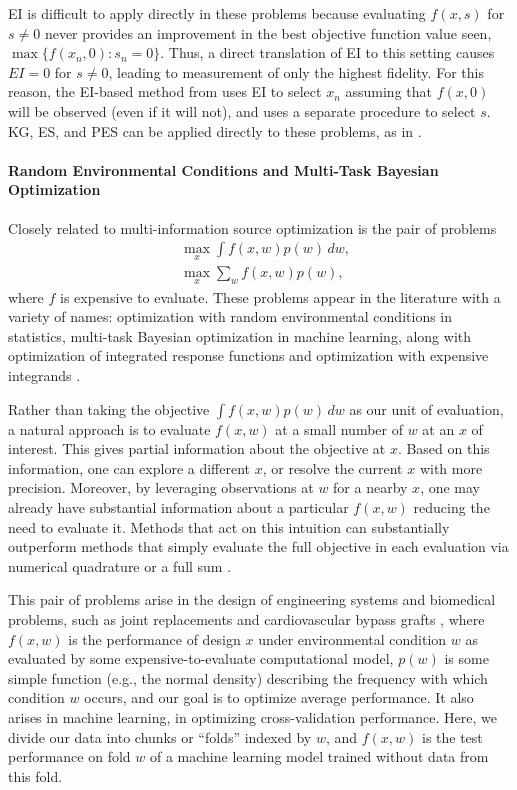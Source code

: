 \documentclass{article}
\begin{document}
EI is difficult to apply directly in these problems because evaluating $f(x,s)$ for $s\ne 0$ never provides an improvement in the best objective function value seen, $\max \{ f(x_n,0) : s_n = 0 \}$.  Thus, a direct translation of EI to this setting causes $EI=0$ for $s\ne 0$, leading to measurement of only the highest fidelity.  For this reason, the EI-based method from \cite{lam2015multifidelity}
uses EI to select $x_n$ assuming that $f(x,0)$ will be observed (even if it will not), and uses a separate procedure to select $s$.  KG, ES, and PES can be applied directly to these problems, as in \cite{poloczek2017multi}. 

\paragraph{Random Environmental Conditions and Multi-Task Bayesian Optimization}
Closely related to multi-information source optimization is the pair of problems
\begin{align*}
&\max_x \int f(x,w) p(w)\,dw,\\
&\max_x \sum_w f(x,w) p(w),
\end{align*}
where $f$ is expensive to evaluate.  
These problems appear in the literature with a variety of names: optimization with random environmental conditions \citep{chang2001design} in statistics, multi-task Bayesian optimization \citep{swersky2013multi} in machine learning, along with optimization of integrated response functions \citep{williams2000sequential} and optimization with expensive integrands \citep{toscano2018bayesian}.

Rather than taking the objective $\int f(x,w) p(w)\,dw$ as our unit of evaluation, a natural approach is to evaluate $f(x,w)$ at a small number of $w$ at an $x$ of interest.  This gives partial information about the objective at $x$.  Based on this information, one can explore a different $x$, or resolve the current $x$ with more precision.  Moreover, by leveraging observations at $w$ for a nearby $x$, one may already have substantial information about a particular $f(x,w)$ reducing the need to evaluate it.  Methods that act on this intuition can substantially outperform methods that simply evaluate the full objective in each evaluation via numerical quadrature or a full sum \citep{toscano2018bayesian}.

This pair of problems arise in the design of engineering systems and biomedical problems, such as joint replacements \citep{chang2001design} and cardiovascular bypass grafts \citep{xie2012optimization}, where $f(x,w)$ is the performance of design $x$ under environmental condition $w$ as evaluated by some expensive-to-evaluate computational model, $p(w)$ is some simple function (e.g., the normal density) describing the frequency with which condition $w$ occurs, and our goal is to optimize average performance.
It also arises in machine learning, in optimizing cross-validation performance.  Here, we divide our data into chunks or ``folds'' indexed by $w$, and $f(x,w)$ is the test performance on fold $w$ of a machine learning model trained without data from this fold.
\end{document}
